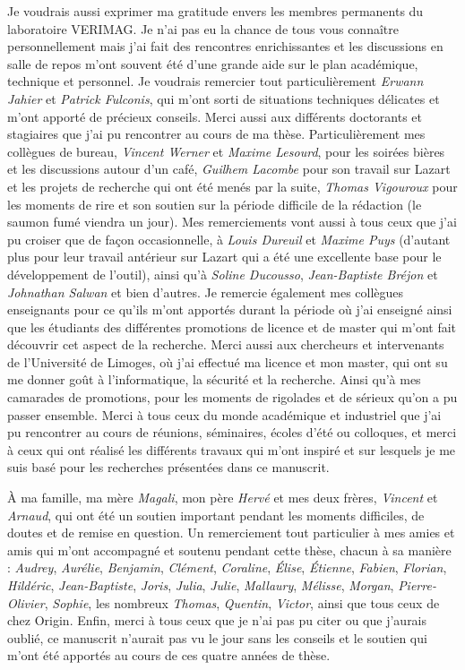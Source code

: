 \documentclass[a4paper,10pt,twoside]{lib/StyleThese}
\begin{document}
    Je voudrais aussi exprimer ma gratitude envers les membres permanents du laboratoire VERIMAG. Je n'ai pas eu la chance de tous vous connaître personnellement mais j'ai fait des rencontres enrichissantes et les discussions en salle de repos m'ont souvent été d'une grande aide sur le plan académique, technique et personnel.
    Je voudrais remercier tout particulièrement \textit{Erwann Jahier} et \textit{Patrick Fulconis}, qui m'ont sorti de situations techniques délicates et m'ont apporté de précieux conseils.
    Merci aussi aux différents doctorants et stagiaires que j'ai pu rencontrer au cours de ma thèse. Particulièrement mes collègues de bureau, \textit{Vincent Werner} et \textit{Maxime Lesourd}, pour les soirées bières et les discussions autour d'un café, \textit{Guilhem Lacombe} pour son travail sur Lazart et les projets de recherche qui ont été menés par la suite, \textit{Thomas Vigouroux} pour les moments de rire et son soutien sur la période difficile de la rédaction (le saumon fumé viendra un jour).
    Mes remerciements vont aussi à tous ceux que j'ai pu croiser que de façon occasionnelle, à \textit{Louis Dureuil} et \textit{Maxime Puys} (d'autant plus pour leur travail antérieur sur Lazart qui a été une excellente base pour le développement de l'outil), ainsi qu'à \textit{Soline Ducousso}, \textit{Jean-Baptiste Bréjon } et \textit{Johnathan Salwan} et bien d'autres.
    Je remercie également mes collègues enseignants pour ce qu'ils m'ont apportés durant la période où j'ai enseigné ainsi que les étudiants des différentes promotions de licence et de master qui m'ont fait découvrir cet aspect de la recherche.
    Merci aussi aux chercheurs et intervenants de l'Université de Limoges, où j'ai effectué ma licence et mon master, qui ont su me donner goût à l'informatique, la sécurité et la recherche. Ainsi qu'à mes camarades de promotions, pour les moments de rigolades et de sérieux qu'on a pu passer ensemble.
    Merci à tous ceux du monde académique et industriel que j'ai pu rencontrer au cours de réunions, séminaires, écoles d'été ou colloques, et merci à ceux qui ont réalisé les différents travaux qui m'ont inspiré et sur lesquels je me suis basé pour les recherches présentées dans ce manuscrit.
    
    À ma famille, ma mère \textit{Magali}, mon père \textit{Hervé} et mes deux frères, \textit{Vincent} et \textit{Arnaud}, qui ont été un soutien important pendant les moments difficiles, de doutes et de remise en question. 
    Un remerciement tout particulier à mes amies et amis qui m'ont accompagné et soutenu pendant cette thèse, chacun à sa manière : \textit{Audrey}, \textit{Aurélie}, \textit{Benjamin}, \textit{Clément}, \textit{Coraline}, \textit{Élise}, \textit{Étienne}, \textit{Fabien}, \textit{Florian}, \textit{Hildéric}, \textit{Jean-Baptiste}, \textit{Joris}, \textit{Julia}, \textit{Julie}, \textit{Mallaury}, \textit{Mélisse}, \textit{Morgan}, \textit{Pierre-Olivier}, \textit{Sophie}, les nombreux \textit{Thomas}, \textit{Quentin}, \textit{Victor}, ainsi que tous ceux de chez Origin.
    Enfin, merci à tous ceux que je n'ai pas pu citer ou que j'aurais oublié, ce manuscrit n'aurait pas vu le jour sans les conseils et le soutien qui m'ont été apportés au cours de ces quatre années de thèse. 
\end{document}
